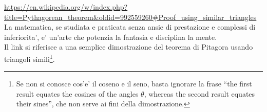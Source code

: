     \url{https://en.wikipedia.org/w/index.php?title=Pythagorean\_theorem&oldid=992559260\#Proof\_using\_similar\_triangles}\\
  La matematica, se studiata e praticata senza ansie di prestazione e complessi di inferiorita',
  e' un'arte che potenzia la fantasia e disciplina la mente.\\
  Il link si riferisce a una semplice dimostrazione del teorema di Pitagora usando triangoli simili\footnote{Se non si conosce cos'e' il coseno e il seno, basta ignorare la frase ``the first result equates the cosines of the angles $\theta$, whereas the second result equates their sines'', che non serve ai fini della dimostrazione.}.\\


